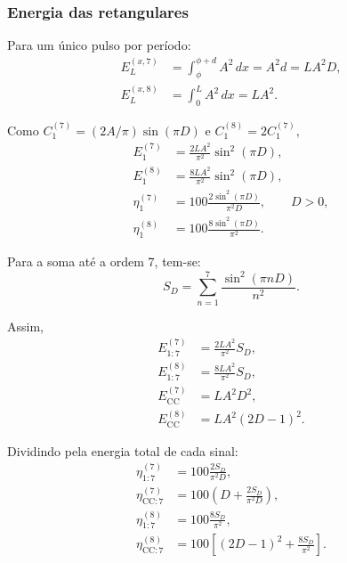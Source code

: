 \subsubsection{Energia das retangulares}
Para um único pulso por período:
\begin{equation}
    \begin{aligned}
        E_L^{(x,7)}&=\int_\phi^{\phi+d}A^2\,dx=A^2d=LA^2D, \\
        E_L^{(x,8)}&=\int_0^LA^2\,dx=LA^2.
    \end{aligned}
\end{equation}

Como $C_1^{(7)}=(2A/\pi)\sin(\pi D)$ e $C_1^{(8)}=2C_1^{(7)}$,
\begin{equation}
    \begin{aligned}
        E_1^{(7)}&=\frac{2LA^2}{\pi^2}\sin^2(\pi D), \\
        E_1^{(8)}&=\frac{8LA^2}{\pi^2}\sin^2(\pi D), \\
        \eta_1^{(7)}&=100\frac{2\sin^2(\pi D)}{\pi^2D}, \qquad D>0, \\
        \eta_1^{(8)}&=100\frac{8\sin^2(\pi D)}{\pi^2}.
    \end{aligned}
\end{equation}

Para a soma até a ordem 7, tem-se:
\begin{equation}
    S_D=\sum_{n=1}^{7}\frac{\sin^2(\pi nD)}{n^2}.
\end{equation}

Assim,
\begin{equation}
    \begin{aligned}
        E_{1:7}^{(7)}&=\frac{2LA^2}{\pi^2}S_D, \\
        E_{1:7}^{(8)}&=\frac{8LA^2}{\pi^2}S_D, \\
        E_{\mathrm{CC}}^{(7)}&=LA^2D^2, \\
        E_{\mathrm{CC}}^{(8)}&=LA^2(2D-1)^2.
    \end{aligned}
\end{equation}

Dividindo pela energia total de cada sinal:
\begin{equation}
    \begin{aligned}
        \eta_{1:7}^{(7)}&=100\frac{2S_D}{\pi^2D}, \\
        \eta_{\mathrm{CC}:7}^{(7)}&=100\left(D+\frac{2S_D}{\pi^2D}\right), \\
        \eta_{1:7}^{(8)}&=100\frac{8S_D}{\pi^2}, \\
        \eta_{\mathrm{CC}:7}^{(8)}&=100\left[(2D-1)^2+\frac{8S_D}{\pi^2}\right].
    \end{aligned}
\end{equation}


